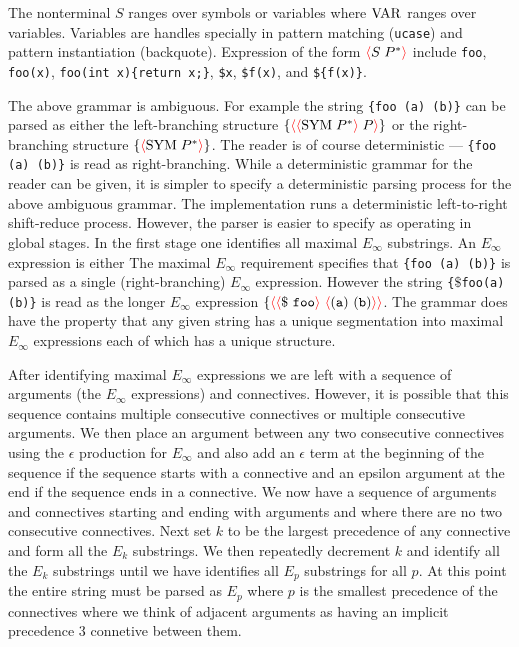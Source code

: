 \documentclass{article}
\newcommand{\fopen}{{\color{red} \langle}}
\newcommand{\fclose}{{\color{red} \rangle}}
\begin{document}
The nonterminal $S$ ranges over symbols or variables where $\mathrm{VAR}$ ranges over variables.  Variables are handles specially in pattern matching ({\tt ucase}) and pattern instantiation (backquote).
Expression of the form $\fopen S\;P^*\fclose$ include {\tt foo}, {\tt foo(x)}, {\tt foo(int x)\{return x;\}},
{\tt \$x}, {\tt \$f(x)}, and {\tt \$\{f(x)\}}.


The above grammar is ambiguous.  For example the string {\tt \{foo (a) (b)\}} can be parsed as either the left-branching structure $\{\fopen\fopen\sym\;P^*\fclose\;P\fclose\}$
or the  right-branching structure $\{\fopen\sym\;P^*\fclose\}$.
The reader is of course deterministic --- {\tt \{foo (a) (b)\}} is read as right-branching.  While a deterministic grammar for the reader can be given, it is simpler
to specify a deterministic parsing process for the above ambiguous grammar.
The implementation runs a deterministic left-to-right shift-reduce process.
However, the parser is easier to specify as operating in global stages.  In the first stage one identifies all maximal $E_\infty$ substrings.
An $E_\infty$ expression is either 
The maximal $E_\infty$ requirement specifies that {\tt \{foo (a) (b)\}} is parsed as a single (right-branching)
$E_\infty$ expression. However the string {\tt \{$\$$\;foo\;(a)\;(b)\}} is read as the longer $E_\infty$ expression $\{\fopen \fopen \mathtt{\$~foo}\fclose\ \fopen \mathtt{(a)~(b)} \fclose \fclose$.
The grammar does have the property that any given string has a unique segmentation into maximal $E_\infty$ expressions each of which has a unique structure.

After identifying maximal $E_\infty$ expressions we are left with a sequence of arguments (the $E_\infty$ expressions) and connectives.
However, it is possible that this sequence contains multiple consecutive connectives or multiple consecutive arguments.  We then place an argument between any two consecutive
connectives using the $\epsilon$ production for $E_\infty$ and also add an $\epsilon$ term at the beginning of the sequence if the sequence starts with a connective and an
epsilon argument at the end if the sequence ends in a connective.  We now have a sequence of arguments and connectives starting and ending with arguments and where there
are no two consecutive connectives.  Next set $k$ to be the largest precedence of any connective and form all the $E_k$ substrings. We then repeatedly decrement $k$ and identify all the $E_k$ substrings
until we have identifies all $E_p$ substrings for all $p$.  At this point the entire string must be parsed as $E_p$ where $p$ is the smallest precedence of the connectives
where we think of adjacent arguments as having an implicit precedence 3 connetive between them.
\end{document}
